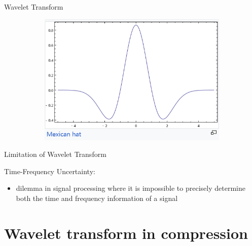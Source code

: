 \documentclass{beamer}
\begin{document}
\begin{frame}{Wavelet Transform}
\begin{figure}[h!]
\begin{subfigure}[b]{0.32\linewidth}
		\end{subfigure}
		\hfill
		\begin{subfigure}[b]{0.32\linewidth}
			\includegraphics[width=\linewidth]{Image/p5.png}
		\end{subfigure}
	\end{figure}
	
	
\end{frame}

\begin{frame}{Limitation of Wavelet Transform}

	Time-Frequency Uncertainty:
	\begin{itemize}
		\item dilemma in signal processing where it is impossible to precisely determine both the time and frequency information of a signal 
	\end{itemize}
	
\end{frame}

\section{Wavelet transform in compression}
\end{document}
